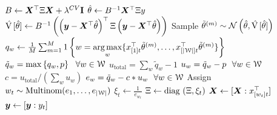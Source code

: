 \documentclass[xcolor={table}]{beamer}
\begin{document}
\begin{frame}[label=bblts]
\begin{framed}
\begin{minipage}{\textwidth}
\begin{algorithm}[H]
\begin{algorithmic}[1]
				\State $B \leftarrow \bm{X}^\top \Xi \bm{X} + \lambda^{CV} \mathbf{I}$  
				\State $\hat\theta \leftarrow B^{-1} \bm{X}^\top \Xi y$
				\State $\hat{{\textrm V}\,}[\hat\theta] \leftarrow B^{-1} \left(\left( \bm{y} - \bm{X}^\top\hat\theta \right)^\top \Xi \left( \bm{y} - \bm{X}^\top\hat\theta \right)\right)$
			\EndIf
				\State Sample $\tilde \theta^{(m)}  \sim \mathcal{N}\left(\hat\theta, \hat{{\textrm V}\,}[\hat\theta] \right)$
			 \EndFor
				\State $q_w \leftarrow \frac{1}{M} \sum_{m=1}^M 1\left\{ w = \underset{w}{\operatorname*{\textrm{arg}\,\textrm{max}}} \{ x_{[1]t}^\top \tilde \theta ^{(m)}, \dots, x_{[|{\EuScript W}|]t}^\top\tilde \theta^{(m)} \}  \right\}$ 
     			\State $\tilde{q}_w =\max\left\{q_w, p\right\}\ \ \forall w \in {\EuScript W}$ 
			\State $u_{\textrm{total}} = \sum_w \tilde{q}_w - 1$ 
			\State $u_{w} = \tilde{q}_w - p \ \ \forall w \in {\EuScript W}$
			\State $ c = u_{\textrm{total}} / \left( \sum_w u_{w} \right)$
			\State $e_w = \tilde{q}_w -c*u_{w} \ \ \forall w \in {\EuScript W}$
		\EndIf
		\State Assign $w_t \sim \textrm{Multinom}( e_{1}, \dots,  e_{|{\EuScript W}|} )$ 
		\State $\xi_t \leftarrow \frac{ 1 }{e_{w_t}}$ 
		\State $\Xi \leftarrow {\textrm {diag} }\, \left(\Xi, \xi_t\right)$ 
		\State $\bm{X} \leftarrow [\bm{X}:x_{[w_t]t}^\top]$ 
		\State $\bm{y} \leftarrow  [\bm{y}: y_t]$ 
	\EndFor
    \end{algorithmic}
\end{algorithm}
 \end{minipage}
 \vspace{-0.8 em}
\end{framed}
 \vspace{-0.5 em}
 \hyperlink{designend2}{}
  \hyperlink{map}{}
\end{frame}
\end{document}
